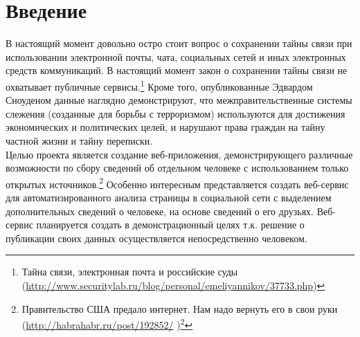 \newpage
\section{Введение}
В настоящий момент довольно остро стоит вопрос о сохранении тайны связи при использовании электронной почты, чата, социальных сетей и иных электронных средств коммуникаций. В настоящий момент  закон о сохранении тайны связи не охватывает публичные сервисы.\footnote{ Тайна связи, электронная почта и российские суды (\url{http://www.securitylab.ru/blog/personal/emeliyannikov/37733.php})}
Кроме того, опубликованные Эдвардом Сноуденом данные наглядно демонстрируют, что межправительственные системы слежения (созданные для борьбы с терроризмом) используются для достижения экономических и политических целей, и нарушают права граждан на тайну частной жизни и тайну переписки.\\

Целью проекта является создание веб-приложения, демонстрирующего различные возможности по сбору сведений об отдельном человеке с использованием только открытых источников.\footnote{Правительство США предало интернет. Нам надо вернуть его в свои руки     (\url{http://habrahabr.ru/post/192852/} )\footnote{Эдвард Сноуден (\url{http://ru.wikipedia.org/wiki/Сноуден,\_Эдвард})}} 
Особенно интересным представляется создать веб-сервис для автоматизированного анализа страницы в социальной сети с выделением дополнительных сведений о человеке, на основе сведений о его друзьях. Веб-сервис планируется создать в демонстрационный целях т.к. решение о публикации своих данных осуществляется непосредственно человеком.\\

